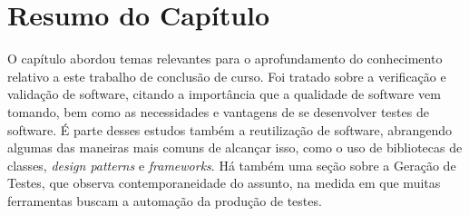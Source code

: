 \section{Resumo do Capítulo}
O capítulo abordou temas relevantes para o aprofundamento do conhecimento relativo a este trabalho de conclusão de curso. Foi tratado sobre a verificação e validação de software, citando a importância que a qualidade de software vem tomando, bem como as necessidades e vantagens de se desenvolver testes de software. É parte desses estudos também a reutilização de software, abrangendo algumas das maneiras mais comuns de alcançar isso, como o uso de bibliotecas de classes, \textit{design patterns} e \textit{frameworks}. Há também uma seção sobre a Geração de Testes, que observa contemporaneidade do assunto, na medida em que muitas ferramentas buscam a automação da produção de testes.










